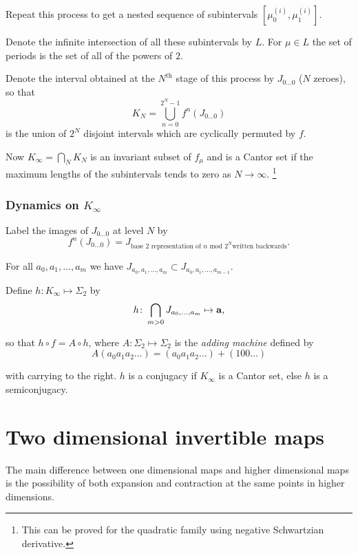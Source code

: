 \documentclass{notes}
\theoremstyle{plain}
\begin{document}
Repeat this process to get a nested sequence of subintervals
$[\mu_0^{(i)}, \mu_1^{(i)}]$.

\vspace{1.5in}

Denote the infinite intersection of all these subintervals by $L$.
For $\mu \in L$ the set of periods is the set of all of the powers of $2$.

Denote the interval obtained at the $N^{\text{th}}$ stage of this
process by $J_{0 \dots 0}$ ($N$ zeroes), so that
\[
K_N = \bigcup_{n=0}^{2^N - 1} f^n(J_{0\dots0}) 
\]
is the union of $2^N$ disjoint intervals which are cyclically permuted by
$f$.

\vspace{2in}

Now $K_\infty = \bigcap_N K_N$ is an invariant subset
of $f_\mu$ and is a Cantor set if the maximum lengths of the subintervals
tends to zero as $N \to \infty$.%
\footnote{This can be proved for the quadratic family
using negative Schwartzian derivative.}

\subsection{Dynamics on $K_\infty$}

Label the images of $J_{0\dots0}$ at level $N$ by
\[
f^n(J_{0\dots0}) = J_{\text{base 2 representation of $n$ mod $2^N$
written backwards}}.
\]

For all $a_0, a_1, \dots, a_m$ we have
$J_{a_0, a_1, \dots, a_m} \subset J_{a_0, a_1, \dots, a_{m-1}}$.

Define $h \colon K_\infty \mapsto \Sigma_2$ by
\[
h \colon \bigcap_{m > 0} J_{a_0,\dots,a_m}
\mapsto \mathbf{a},
\]

so that $h \circ f = A \circ h$, where
$A \colon \Sigma_2 \mapsto \Sigma_2$ is the \emph{adding machine}
defined by
\[
A(a_0 a_1 a_2\dots) = (a_0 a_1 a_2 \dots )
+ (1 0 0 \dots )
\] 

with carrying to the right.  $h$ is a conjugacy if $K_\infty$
is a Cantor set, else $h$ is a semiconjugacy.

\chapter{Two dimensional invertible maps}

The main difference between one dimensional maps and higher dimensional
maps is the possibility of both expansion and contraction at the same
points in higher dimensions.
\end{document}

